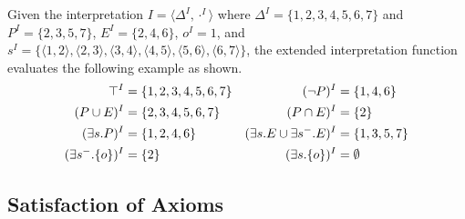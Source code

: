 \begin{example}
  Given the interpretation $I = \langle \Delta^I, \cdot^I \rangle$ where $\Delta^I = \{ 1, 2, 3, 4, 5, 6, 7 \}$ and $P^I = \{ 2, 3, 5, 7 \}$, $E^I = \{ 2, 4, 6 \}$, $o^I = 1$, and $s^I = \{ \langle 1, 2 \rangle,\allowbreak \langle 2, 3 \rangle,\allowbreak \langle 3, 4 \rangle,\allowbreak \langle 4, 5 \rangle,\allowbreak \langle 5, 6 \rangle,\allowbreak \langle 6, 7 \rangle \}$, the extended interpretation function evaluates the following example as shown.
  \begin{align*}
    \top^I &= \{ 1, 2, 3, 4, 5, 6, 7 \} &
    (\lnot P)^I &= \{ 1, 4, 6 \} \\
    (P \cup E)^I &= \{ 2, 3, 4, 5, 6, 7 \} &
    (P \cap E)^I &= \{ 2 \} \\
    (\exists s.P)^I &= \{ 1, 2, 4, 6 \} &
    (\exists s.E \cup \exists s^-.E)^I &= \{ 1, 3, 5, 7 \} \\
    (\exists s^-.\{o\})^I &= \{ 2 \} &
    (\exists s.\{o\})^I &= \emptyset
  \end{align*}
\end{example}

\subsection{Satisfaction of Axioms} \label{satisfaction-of-axioms}

